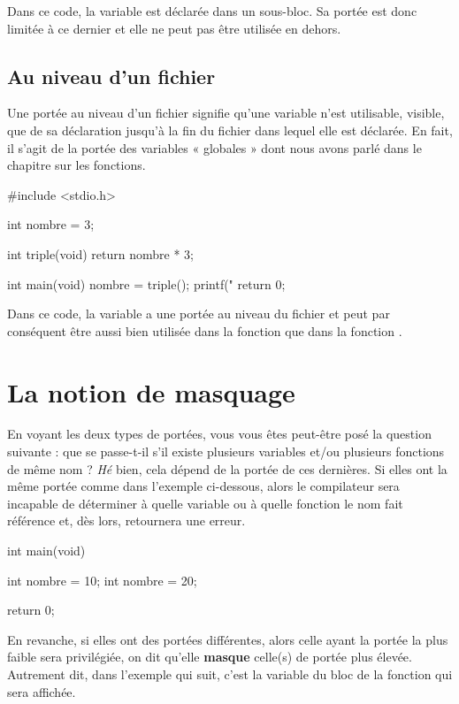 Dans ce code, la variable  est déclarée dans un
sous-bloc. Sa portée est donc limitée à ce dernier et elle ne peut pas
être utilisée en dehors.

\subsection{Au niveau d'un fichier}
\label{au-niveau-dun-fichier}

Une portée au niveau d'un fichier signifie qu'une variable n'est
utilisable, visible, que de sa déclaration jusqu'à la fin du fichier
dans lequel elle est déclarée. En fait, il s'agit de la portée des
variables « globales » dont nous avons parlé dans le chapitre sur les
fonctions.

\begin{C}
#include <stdio.h>

int nombre = 3;

int triple(void)
{
    return nombre * 3;
}

int main(void)
{
    nombre = triple();
    printf("%
    return 0;
}
\end{C}

Dans ce code, la variable  a une portée au niveau du
fichier et peut par conséquent être aussi bien utilisée dans la fonction
 que dans la fonction .

\section{La notion de masquage}
\label{la-notion-de-masquage}

En voyant les deux types de portées, vous vous êtes peut-être posé la
question suivante : que se passe-t-il s'il existe plusieurs variables
et/ou plusieurs fonctions de même nom ? \emph{Hé} bien, cela dépend de
la portée de ces dernières. Si elles ont la même portée comme dans
l'exemple ci-dessous, alors le compilateur sera incapable de déterminer
à quelle variable ou à quelle fonction le nom fait référence et, dès
lors, retournera une erreur.

\begin{C}
int main(void)
{
    int nombre = 10;
    int nombre = 20;

    return 0;
}
\end{C}

En revanche, si elles ont des portées différentes, alors celle ayant la
portée la plus faible sera privilégiée, on dit qu'elle \textbf{masque}
celle(s) de portée plus élevée. Autrement dit, dans l'exemple qui suit,
c'est la variable du bloc de la fonction  qui sera
affichée.

